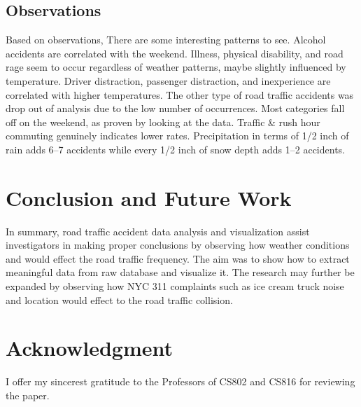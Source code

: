 \documentclass[conference]{IEEEtran}
\begin{document}
\subsection{Observations}
Based on observations, There are some interesting patterns to see. Alcohol accidents are correlated with the weekend. Illness, physical disability, and road rage seem to occur regardless of weather patterns, maybe slightly influenced by temperature. Driver distraction, passenger distraction, and inexperience are correlated with higher temperatures. The other type of road traffic accidents was drop out of analysis due to the low number of occurrences. Most categories fall off on the weekend, as proven by looking at the data. Traffic \& rush hour commuting genuinely indicates lower rates.  Precipitation in terms of 1/2 inch of rain adds 6–7 accidents while every 1/2 inch of snow depth adds 1–2 accidents. 

\section{Conclusion and Future Work}
In summary, road traffic accident data analysis and visualization assist investigators in making proper conclusions by observing how weather conditions and would effect the road traffic frequency.  The aim was to show how to extract meaningful data from raw database and visualize it. The research may further be expanded by observing how NYC 311 complaints such as ice cream truck noise and location would effect to the road traffic collision. 





\section*{Acknowledgment}
I offer my sincerest gratitude to the Professors of CS802 and CS816 for reviewing the paper.



{\small}
 
\end{document}
